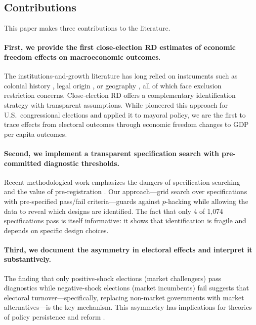 \documentclass[12pt,a4paper]{article}
\begin{document}
\subsection{Contributions}

This paper makes three contributions to the literature.

\paragraph{First, we provide the first close-election RD estimates of 
economic freedom effects on macroeconomic outcomes.} The institutions-and-growth 
literature has long relied on instruments such as colonial history 
\citep{acemoglu2001colonial}, legal origin \citep{laporta1999quality}, 
or geography \citep{sachs2001tropical}, all of which face exclusion 
restriction concerns. Close-election RD offers a complementary identification 
strategy with transparent assumptions. While \citet{lee2008randomized} 
pioneered this approach for U.S.\ congressional elections and 
\citet{ferreira2009votes} applied it to mayoral policy, we are the first 
to trace effects from electoral outcomes through economic freedom changes 
to GDP per capita outcomes.

\paragraph{Second, we implement a transparent specification search with 
pre-committed diagnostic thresholds.} Recent methodological work emphasizes 
the dangers of specification searching and the value of pre-registration 
\citep{christensen2018transparency, brodeur2020methods}. Our approach---grid 
search over specifications with pre-specified pass/fail criteria---guards 
against $p$-hacking while allowing the data to reveal which designs are 
identified. The fact that only 4 of 1,074 specifications pass is itself 
informative: it shows that identification is fragile and depends on 
specific design choices.

\paragraph{Third, we document the asymmetry in electoral effects and 
interpret it substantively.} The finding that only positive-shock elections 
(market challengers) pass diagnostics while negative-shock elections 
(market incumbents) fail suggests that electoral turnover---specifically, 
replacing non-market governments with market alternatives---is the key 
mechanism. This asymmetry has implications for theories of policy persistence 
and reform \citep{fernandez1991resistance, rodrik1996understanding}.
\end{document}
